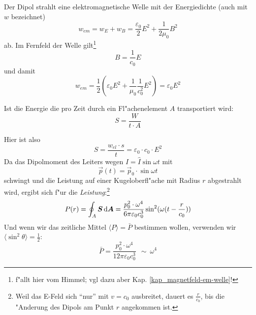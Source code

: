Der Dipol strahlt eine elektromagnetische Welle mit der Energiedichte (auch mit $w$ bezeichnet)
\begin{equation}
   \label{eq:394}
    w_{em} = w_E + w_B= \frac{\varepsilon_0}{2}E^2 + \frac{1}{2\mu_0} B^2
\end{equation}
ab. Im Fernfeld der Welle gilt\footnote{f"allt hier vom Himmel; vgl
  dazu aber Kap. \ref{kap_magnetfeld-em-welle}!}
\begin{equation}
   \label{eq:395}
   B = \frac{1}{c_0}E
\end{equation}
und damit
\begin{equation}
   \label{eq:396}
w_{em} = \frac{1}{2} \left ( \varepsilon_0 E^2 + \frac{1}{\mu_0}
      \frac{1}{c_0^2}E^2 \right ) = \varepsilon_0 E^2
\end{equation}
\begin{Def}
   [Energiestromdichte $S$] Ist die Energie die pro Zeit durch ein
   Fl"achenelement $A$ transportiert wird:
   \begin{equation}
      \label{eq:397}
      S = \frac{W}{t \cdot A}
   \end{equation}
\end{Def}
Hier ist also
\begin{equation}
   \label{eq:398}
   S = \frac{w_{el} \cdot s}{t} = \varepsilon_0 \cdot c_0 \cdot E^2
\end{equation}
Da das Dipolmoment des Leiters wegen $I = \hat I \sin \omega t$ mit
\begin{equation*}
   \vec p(t) = \vec p_0 \cdot \sin \omega t
\end{equation*}
schwingt und die Leistung auf einer Kugeloberfl"ache mit Radius $r$
abgestrahlt wird, ergibt sich f"ur die \emph{Leistung}:\footnote{Weil
  das E-Feld sich "`nur"' mit $v = c_0$ ausbreitet, dauert es
  $\frac{r}{c_0}$, bis die "Anderung des Dipols am Punkt $r$ angekommen
  ist.}
\begin{equation}
   \label{eq:399}
   P(r) = \oint_A \boldsymbol{S} \, \mathrm{d} \boldsymbol{A} = \frac{p_0^2 \cdot
     \omega^4}{6\pi \varepsilon_0 c_0^3} \sin^2(\omega (t -
   \frac{r}{c_0}) )
\end{equation}
Und wenn wir das zeitliche Mittel $\langle P  \rangle = \bar P$ bestimmen
wollen, verwenden wir $\langle \sin^2\theta  \rangle = \frac{1}{2}$:
\begin{equation}
   \label{eq:400}
   \bar P = \frac{p_0^2 \cdot \omega^4}{12 \pi \varepsilon_0 c_0^3} ~
   ~ \sim ~ \omega^4
\end{equation}


